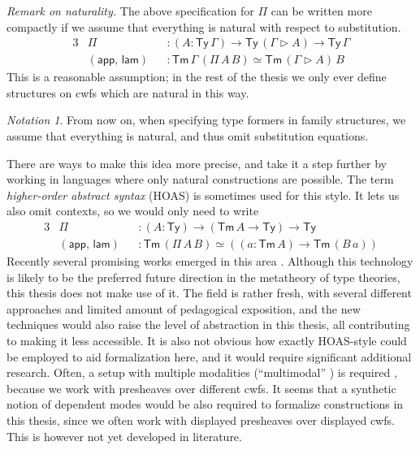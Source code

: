 \documentclass[12pt,a4paper,twoside,openany]{book}
\theoremstyle{remark}
\newtheorem{notation}{Notation}
\theoremstyle{definition}
\theoremstyle{theorem}
\newcommand{\ms}[1]{\mathsf{#1}}
\newcommand{\Tm}{\mathsf{Tm}}
\newcommand{\Ty}{\mathsf{Ty}}
\newcommand{\ext}{\triangleright}
\newcommand{\app}{\ms{app}}
\newcommand{\lam}{\ms{lam}}
\begin{document}
\emph{Remark on naturality.} The above specification for $\Pi$ can be written
more compactly if we assume that everything is natural with respect to
substitution.
\begin{alignat*}{3}
  &\Pi            &&: (A : \Ty\,\Gamma) \to \Ty\,(\Gamma\ext A) \to \Ty\,\Gamma\\
  & (\app,\,\lam) &&: \Tm\,\Gamma\,(\Pi\,A\,B) \simeq \Tm\,(\Gamma \ext A)\,B
\end{alignat*}
This is a reasonable assumption; in the rest of the thesis we only ever define
structures on cwfs which are natural in this way.

\begin{notation} From now on, when specifying type formers in family structures,
we assume that everything is natural, and thus omit substitution equations.
\end{notation}

There are ways to make this idea more precise, and take it a step further by
working in languages where only natural constructions are possible. The term
\emph{higher-order abstract syntax} (HOAS) is sometimes used for this style. It lets us
also omit contexts, so we would only need to write
\begin{alignat*}{3}
  &\Pi            &&: (A : \Ty) \to (\Tm\,A \to \Ty) \to \Ty\\
  & (\app,\,\lam) &&: \Tm\,(\Pi\,A\,B) \simeq ((a : \Tm\,A) \to \Tm\,(B\,a))
\end{alignat*}
Recently several promising works emerged in this area
\cite{uemura,ctt-normalization,bocquet2021induction}. Although this technology
is likely to be the preferred future direction in the metatheory of type
theories, this thesis does not make use of it. The field is rather fresh, with
several different approaches and limited amount of pedagogical exposition, and
the new techniques would also raise the level of abstraction in this thesis, all
contributing to making it less accessible. It is also not obvious how exactly
HOAS-style could be employed to aid formalization here, and it would require
significant additional research.  Often, a setup with multiple modalities
(``multimodal'' \cite{gratzer20multimodal}) is required
\cite{bocquet2021induction}, because we work with presheaves over different
cwfs. It seems that a synthetic notion of dependent modes would be also required
to formalize constructions in this thesis, since we often work with displayed
presheaves over displayed cwfs. This is however not yet developed in literature.
\end{document}
